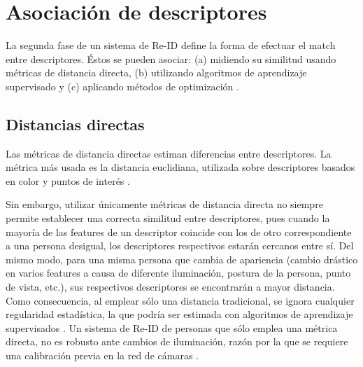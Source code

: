 \documentclass[../memoria.tex]{subfiles}
\begin{document}
\section{Asociación de descriptores}

La segunda fase de un sistema de Re-ID define la forma de efectuar el match entre descriptores. Éstos se pueden asociar: (a) midiendo su similitud usando métricas de distancia directa, (b) utilizando algoritmos de aprendizaje supervisado y (c) aplicando métodos de optimización \cite{mazzon2012person}.
 
\subsection{Distancias directas}
Las métricas de distancia directas estiman diferencias entre descriptores. La métrica más usada es la distancia euclidiana, utilizada sobre descriptores basados en color \cite{farenzena2010person, bak2010person} y puntos de interés \cite{gheissari2006person}. 



Sin embargo, utilizar únicamente métricas de distancia directa no siempre permite establecer una correcta similitud entre descriptores, pues cuando la mayoría de las features de un descriptor coincide con los de otro correspondiente a una persona desigual, los descriptores respectivos estarán cercanos entre sí. Del mismo modo, para una misma persona que cambia de apariencia (cambio drástico en varios features a causa de diferente iluminación, postura de la persona, punto de vista, etc.), sus respectivos descriptores se encontrarán a mayor distancia. Como consecuencia, al emplear sólo una distancia tradicional, se ignora cualquier regularidad estadística, la que podría ser estimada con algoritmos de aprendizaje supervisados \cite{zheng2011person, prosser2010person}. Un sistema de Re-ID de personas que sólo emplea una métrica directa, no es robusto ante cambios de iluminación, razón por la que se requiere una calibración previa en la red de cámaras \cite{gilbert2006tracking, porikli2003multi, stein1999tracking, javed2008modeling}. %
\end{document}
